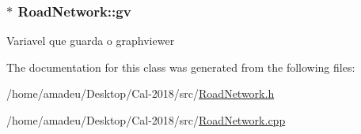 \subsubsection[{\texorpdfstring{gv}{gv}}]{$\ast$ Road\+Network\+::gv\hspace{0.3cm}{\ttfamily [private]}}\hypertarget{classRoadNetwork_a3512bc7d6e202925537873f3e769141c}{}\label{classRoadNetwork_a3512bc7d6e202925537873f3e769141c}
Variavel que guarda o graphviewer 

The documentation for this class was generated from the following files\+:\begin{DoxyCompactItemize}
\item 
/home/amadeu/\+Desktop/\+Cal-\/2018/src/\hyperlink{RoadNetwork_8h}{Road\+Network.\+h}\item 
/home/amadeu/\+Desktop/\+Cal-\/2018/src/\hyperlink{RoadNetwork_8cpp}{Road\+Network.\+cpp}\end{DoxyCompactItemize}
